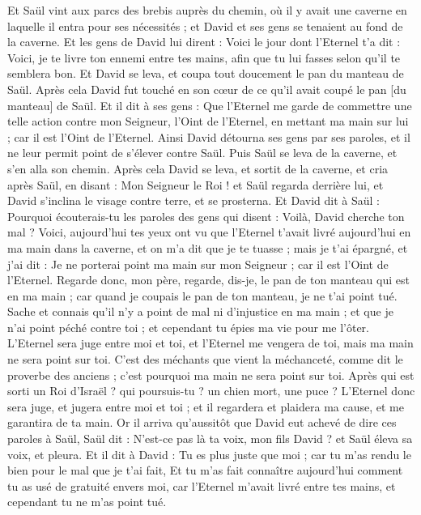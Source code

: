 \begin{multicols}{2}
Et Saül vint aux parcs des brebis auprès du chemin, où il y avait une caverne en laquelle il entra pour ses nécessités ; et David et ses gens se tenaient au fond de la caverne.
Et les gens de David lui dirent : Voici le jour dont l'Eternel t'a dit : Voici, je te livre ton ennemi entre tes mains, afin que tu lui fasses selon qu'il te semblera bon. Et David se leva, et coupa tout doucement le pan du manteau de Saül.
Après cela David fut touché en son cœur de ce qu'il avait coupé le pan [du manteau] de Saül.
Et il dit à ses gens : Que l'Eternel me garde de commettre une telle action contre mon Seigneur, l'Oint de l'Eternel, en mettant ma main sur lui ; car il est l'Oint de l'Eternel.
Ainsi David détourna ses gens par ses paroles, et il ne leur permit point de s'élever contre Saül. Puis Saül se leva de la caverne, et s'en alla son chemin.
Après cela David se leva, et sortit de la caverne, et cria après Saül, en disant : Mon Seigneur le Roi ! et Saül regarda derrière lui, et David s'inclina le visage contre terre, et se prosterna.
Et David dit à Saül : Pourquoi écouterais-tu les paroles des gens qui disent : Voilà, David cherche ton mal ?
Voici, aujourd'hui tes yeux ont vu que l'Eternel t'avait livré aujourd'hui en ma main dans la caverne, et on m'a dit que je te tuasse ; mais je t'ai épargné, et j'ai dit : Je ne porterai point ma main sur mon Seigneur ; car il est l'Oint de l'Eternel.
Regarde donc, mon père, regarde, dis-je, le pan de ton manteau qui est en ma main ; car quand je coupais le pan de ton manteau, je ne t'ai point tué. Sache et connais qu'il n'y a point de mal ni d'injustice en ma main ; et que je n'ai point péché contre toi ; et cependant tu épies ma vie pour me l'ôter.
L'Eternel sera juge entre moi et toi, et l'Eternel me vengera de toi, mais ma main ne sera point sur toi.
C'est des méchants que vient la méchanceté, comme dit le proverbe des anciens ; c'est pourquoi ma main ne sera point sur toi.
Après qui est sorti un Roi d'Israël ? qui poursuis-tu ? un chien mort, une puce ?
L'Eternel donc sera juge, et jugera entre moi et toi ; et il regardera et plaidera ma cause, et me garantira de ta main.
Or il arriva qu'aussitôt que David eut achevé de dire ces paroles à Saül, Saül dit : N'est-ce pas là ta voix, mon fils David ? et Saül éleva sa voix, et pleura.
Et il dit à David : Tu es plus juste que moi ; car tu m'as rendu le bien pour le mal que je t'ai fait,
Et tu m'as fait connaître aujourd'hui comment tu as usé de gratuité envers moi, car l'Eternel m'avait livré entre tes mains, et cependant tu ne m'as point tué.

\end{multicols}
